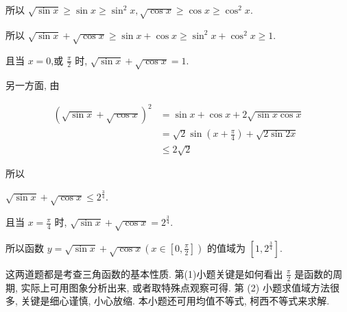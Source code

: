 \begin{solution}
	所以 $\sqrt{\sin x} \geqslant \sin x \geqslant \sin ^{2} x, \sqrt{\cos x} \geqslant \cos x \geqslant \cos ^{2} x$.

	所以 $\sqrt{\sin x}+\sqrt{\cos x} \geqslant \sin x+\cos x \geqslant \sin ^{2} x+\cos ^{2} x \geqslant 1$.

	且当 $x=0$,或 $\frac{\pi}{2}$ 时, $\sqrt{\sin x}+\sqrt{\cos x}=1$.

	另一方面, 由

	$$
		\begin{aligned}
			(\sqrt{\sin x}+\sqrt{\cos x})^{2} & =\sin x+\cos x+2 \sqrt{\sin x \cos x}                         \\
			                                  & =\sqrt{2} \sin \left(x+\frac{\pi}{4}\right)+\sqrt{2 \sin 2 x} \\
			                                  & \leqslant 2 \sqrt{2}
		\end{aligned}
	$$

	所以

	$\sqrt{\sin x}+\sqrt{\cos x} \leqslant 2^{\frac{3}{4}}$.

	且当 $x=\frac{\pi}{4}$ 时, $\sqrt{\sin x}+\sqrt{\cos x}=2^{\frac{3}{4}}$.

	所以函数 $y=\sqrt{\sin x}+\sqrt{\cos x}\left(x \in\left[0, \frac{\pi}{2}\right]\right)$ 的值域为 $\left[1,2^{\frac{3}{4}}\right]$.
\end{solution}
\begin{note}
	这两道题都是考查三角函数的基本性质. 第(1)小题关键是如何看出 $\frac{\pi}{2}$ 是函数的周期, 实际上可用图象分析出来, 或者取特殊点观察可得. 第 (2) 小题求值域方法很多, 关键是细心谨慎, 小心放缩. 本小题还可用均值不等式, 柯西不等式来求解.\\
\end{note}


